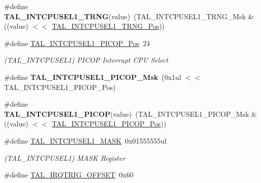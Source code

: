 \begin{DoxyCompactItemize}
\item 
\hypertarget{group___s_a_m_l21___t_a_l_ga4663cdac2cb82326b6071c0bc931f4cb}{}\#define {\bfseries T\+A\+L\+\_\+\+I\+N\+T\+C\+P\+U\+S\+E\+L1\+\_\+\+T\+R\+N\+G}(value)~(T\+A\+L\+\_\+\+I\+N\+T\+C\+P\+U\+S\+E\+L1\+\_\+\+T\+R\+N\+G\+\_\+\+Msk \& ((value) $<$$<$ \hyperlink{group___s_a_m_l21___t_a_l_gac159740f515cabecc3263fc79604f1f6}{T\+A\+L\+\_\+\+I\+N\+T\+C\+P\+U\+S\+E\+L1\+\_\+\+T\+R\+N\+G\+\_\+\+Pos}))\label{group___s_a_m_l21___t_a_l_ga4663cdac2cb82326b6071c0bc931f4cb}

\item 
\hypertarget{group___s_a_m_l21___t_a_l_ga0416d0be4a8abfc61a3ab2fc45ad4681}{}\#define \hyperlink{group___s_a_m_l21___t_a_l_ga0416d0be4a8abfc61a3ab2fc45ad4681}{T\+A\+L\+\_\+\+I\+N\+T\+C\+P\+U\+S\+E\+L1\+\_\+\+P\+I\+C\+O\+P\+\_\+\+Pos}~24\label{group___s_a_m_l21___t_a_l_ga0416d0be4a8abfc61a3ab2fc45ad4681}

\begin{DoxyCompactList}\small\item\em (T\+A\+L\+\_\+\+I\+N\+T\+C\+P\+U\+S\+E\+L1) P\+I\+C\+O\+P Interrupt C\+P\+U Select \end{DoxyCompactList}\item 
\hypertarget{group___s_a_m_l21___t_a_l_ga8221fcbc28d9988c1c32be8cd4b909a6}{}\#define {\bfseries T\+A\+L\+\_\+\+I\+N\+T\+C\+P\+U\+S\+E\+L1\+\_\+\+P\+I\+C\+O\+P\+\_\+\+Msk}~(0x1ul $<$$<$ T\+A\+L\+\_\+\+I\+N\+T\+C\+P\+U\+S\+E\+L1\+\_\+\+P\+I\+C\+O\+P\+\_\+\+Pos)\label{group___s_a_m_l21___t_a_l_ga8221fcbc28d9988c1c32be8cd4b909a6}

\item 
\hypertarget{group___s_a_m_l21___t_a_l_gaf9b2c456b5436c244b84b07ea6f49d94}{}\#define {\bfseries T\+A\+L\+\_\+\+I\+N\+T\+C\+P\+U\+S\+E\+L1\+\_\+\+P\+I\+C\+O\+P}(value)~(T\+A\+L\+\_\+\+I\+N\+T\+C\+P\+U\+S\+E\+L1\+\_\+\+P\+I\+C\+O\+P\+\_\+\+Msk \& ((value) $<$$<$ \hyperlink{group___s_a_m_l21___t_a_l_ga0416d0be4a8abfc61a3ab2fc45ad4681}{T\+A\+L\+\_\+\+I\+N\+T\+C\+P\+U\+S\+E\+L1\+\_\+\+P\+I\+C\+O\+P\+\_\+\+Pos}))\label{group___s_a_m_l21___t_a_l_gaf9b2c456b5436c244b84b07ea6f49d94}

\item 
\hypertarget{group___s_a_m_l21___t_a_l_ga8a85cf38c1577b3d972e6f2687000e90}{}\#define \hyperlink{group___s_a_m_l21___t_a_l_ga8a85cf38c1577b3d972e6f2687000e90}{T\+A\+L\+\_\+\+I\+N\+T\+C\+P\+U\+S\+E\+L1\+\_\+\+M\+A\+S\+K}~0x01555555ul\label{group___s_a_m_l21___t_a_l_ga8a85cf38c1577b3d972e6f2687000e90}

\begin{DoxyCompactList}\small\item\em (T\+A\+L\+\_\+\+I\+N\+T\+C\+P\+U\+S\+E\+L1) M\+A\+S\+K Register \end{DoxyCompactList}\item 
\hypertarget{group___s_a_m_l21___t_a_l_gabc7ba811179e9030763a8dc88c6c58b2}{}\#define \hyperlink{group___s_a_m_l21___t_a_l_gabc7ba811179e9030763a8dc88c6c58b2}{T\+A\+L\+\_\+\+I\+R\+Q\+T\+R\+I\+G\+\_\+\+O\+F\+F\+S\+E\+T}~0x60\label{group___s_a_m_l21___t_a_l_gabc7ba811179e9030763a8dc88c6c58b2}


\end{DoxyCompactItemize}
